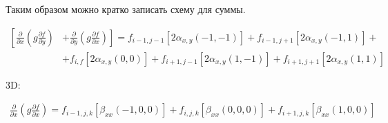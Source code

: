 Таким образом можно кратко записать схему для суммы.

\begin{equation*}
    \begin{split}
        \left[
            \frac
                {\partial}
                {\partial x}
            \left(
                g
                \frac
                    {\partial f}
                    {\partial y}
            \right)
        \right.
            &
        \left.
            +
            \frac
                {\partial}
                {\partial y}
            \left(
                g
                \frac
                    {\partial f}
                    {\partial x}
            \right)
        \right]
        =
        f_{i-1, j-1}
        \left[
            2
            \alpha_{x,y} \left(-1, -1\right)
        \right]
        +
        f_{i-1, j+1}
        \left[
            2
            \alpha_{x,y} \left(-1, 1\right)
        \right]
        +
        \\
        &
        +
        f_{i,f}
        \left[
            2
            \alpha_{x,y} \left(0, 0\right)
        \right]
        +
        f_{i+1, j-1}
        \left[
            2
            \alpha_{x,y} \left(1, -1\right)
        \right]
        +
        f_{i+1, j+1}
        \left[
            2
            \alpha_{x,y} \left(1, 1\right)
        \right]
    \end{split}
\end{equation*}

3D:

\begin{equation*}
    \begin{split}
        \frac
            {\partial}
            {\partial x}
        \left(
            g
            \frac
                {\partial f}
                {\partial x}
        \right)
        =
        f_{i-1, j, k}
        \left[
            \beta_{xx} \left(-1, 0, 0\right)
        \right]
        +
        f_{i, j, k}
        \left[
            \beta_{xx} \left(0, 0, 0\right)
        \right]
        +
        f_{i+1, j, k}
        \left[
            \beta_{xx} \left(1, 0, 0\right)
        \right]
    \end{split}
\end{equation*}

